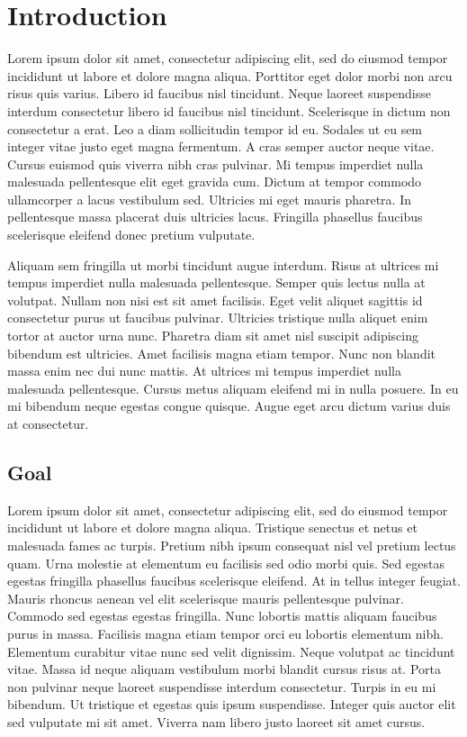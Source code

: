 \chapter{Introduction}
\label{sec:introduction}

Lorem ipsum dolor sit amet, consectetur adipiscing elit, sed do eiusmod tempor incididunt ut labore et dolore magna aliqua. Porttitor eget dolor morbi non arcu risus quis varius. Libero id faucibus nisl tincidunt. Neque laoreet suspendisse interdum consectetur libero id faucibus nisl tincidunt. Scelerisque in dictum non consectetur a erat. Leo a diam sollicitudin tempor id eu. Sodales ut eu sem integer vitae justo eget magna fermentum. A cras semper auctor neque vitae. Cursus euismod quis viverra nibh cras pulvinar. Mi tempus imperdiet nulla malesuada pellentesque elit eget gravida cum. Dictum at tempor commodo ullamcorper a lacus vestibulum sed. Ultricies mi eget mauris pharetra. In pellentesque massa placerat duis ultricies lacus. Fringilla phasellus faucibus scelerisque eleifend donec pretium vulputate.

Aliquam sem fringilla ut morbi tincidunt augue interdum. Risus at ultrices mi tempus imperdiet nulla malesuada pellentesque. Semper quis lectus nulla at volutpat. Nullam non nisi est sit amet facilisis. Eget velit aliquet sagittis id consectetur purus ut faucibus pulvinar. Ultricies tristique nulla aliquet enim tortor at auctor urna nunc. Pharetra diam sit amet nisl suscipit adipiscing bibendum est ultricies. Amet facilisis magna etiam tempor. Nunc non blandit massa enim nec dui nunc mattis. At ultrices mi tempus imperdiet nulla malesuada pellentesque. Cursus metus aliquam eleifend mi in nulla posuere. In eu mi bibendum neque egestas congue quisque. Augue eget arcu dictum varius duis at consectetur.

\section[Goal]{Goal} %

Lorem ipsum dolor sit amet, consectetur adipiscing elit, sed do eiusmod tempor incididunt ut labore et dolore magna aliqua. Tristique senectus et netus et malesuada fames ac turpis. Pretium nibh ipsum consequat nisl vel pretium lectus quam. Urna molestie at elementum eu facilisis sed odio morbi quis. Sed egestas egestas fringilla phasellus faucibus scelerisque eleifend. At in tellus integer feugiat. Mauris rhoncus aenean vel elit scelerisque mauris pellentesque pulvinar. Commodo sed egestas egestas fringilla. Nunc lobortis mattis aliquam faucibus purus in massa. Facilisis magna etiam tempor orci eu lobortis elementum nibh. Elementum curabitur vitae nunc sed velit dignissim. Neque volutpat ac tincidunt vitae. Massa id neque aliquam vestibulum morbi blandit cursus risus at. Porta non pulvinar neque laoreet suspendisse interdum consectetur. Turpis in eu mi bibendum. Ut tristique et egestas quis ipsum suspendisse. Integer quis auctor elit sed vulputate mi sit amet. Viverra nam libero justo laoreet sit amet cursus.

